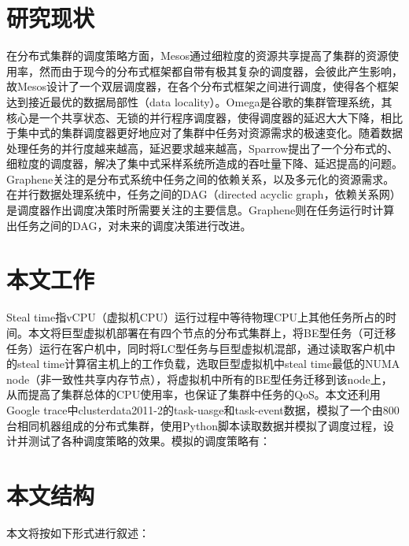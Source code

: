 \section{研究现状}
\label{chap:dissch}
在分布式集群的调度策略方面，Mesos\cite{mesos}通过细粒度的资源共享提高了集群的资源使用率，然而由于现今的分布式框架都自带有极其复杂的调度器，会彼此产生影响，故Mesos设计了一个双层调度器，在各个分布式框架之间进行调度，使得各个框架达到接近最优的数据局部性（data locality）。Omega\cite{omega}是谷歌的集群管理系统，其核心是一个共享状态、无锁的并行程序调度器，使得调度器的延迟大大下降，相比于集中式的集群调度器更好地应对了集群中任务对资源需求的极速变化。随着数据处理任务的并行度越来越高，延迟要求越来越高，Sparrow\cite{sparrow}提出了一个分布式的、细粒度的调度器，解决了集中式采样系统所造成的吞吐量下降、延迟提高的问题。Graphene\cite{graphene}关注的是分布式系统中任务之间的依赖关系，以及多元化的资源需求。在并行数据处理系统中，任务之间的DAG（directed acyclic graph，依赖关系网）是调度器作出调度决策时所需要关注的主要信息。Graphene则在任务运行时计算出任务之间的DAG，对未来的调度决策进行改进。

\section{本文工作}
Steal time指vCPU（虚拟机CPU）运行过程中等待物理CPU上其他任务所占的时间。本文将巨型虚拟机部署在有四个节点的分布式集群上，将BE型任务（可迁移任务）运行在客户机中，同时将LC型任务与巨型虚拟机混部，通过读取客户机中的steal time计算宿主机上的工作负载，选取巨型虚拟机中steal time最低的NUMA node（非一致性共享内存节点），将虚拟机中所有的BE型任务迁移到该node上，从而提高了集群总体的CPU使用率，也保证了集群中任务的QoS。本文还利用Google trace中clusterdata2011-2的task-uasge和task-event数据，模拟了一个由800台相同机器组成的分布式集群，使用Python脚本读取数据并模拟了调度过程，设计并测试了各种调度策略的效果。模拟的调度策略有：


\section{本文结构}
本文将按如下形式进行叙述：
